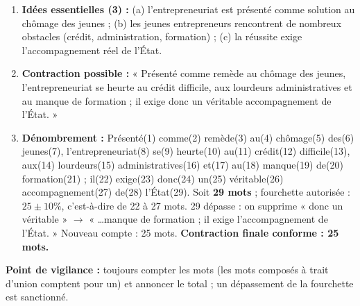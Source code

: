 \documentclass[11pt]{article}
\begin{document}
\begin{corrige}
\begin{enumerate}
\item \textbf{Idées essentielles (3) :} (a) l'entrepreneuriat est présenté comme solution au chômage des jeunes ; (b) les jeunes entrepreneurs rencontrent de nombreux obstacles (crédit, administration, formation) ; (c) la réussite exige l'accompagnement réel de l'État.
\item \textbf{Contraction possible :} « Présenté comme remède au chômage des jeunes, l'entrepreneuriat se heurte au crédit difficile, aux lourdeurs administratives et au manque de formation ; il exige donc un véritable accompagnement de l'État. »
\item \textbf{Dénombrement :} Présenté(1) comme(2) remède(3) au(4) chômage(5) des(6) jeunes(7), l'entrepreneuriat(8) se(9) heurte(10) au(11) crédit(12) difficile(13), aux(14) lourdeurs(15) administratives(16) et(17) au(18) manque(19) de(20) formation(21) ; il(22) exige(23) donc(24) un(25) véritable(26) accompagnement(27) de(28) l'État(29). Soit \textbf{29 mots} ; fourchette autorisée : $25 \pm 10\%$, c'est-à-dire de 22 à 27 mots. 29 dépasse : on supprime « donc un véritable » $\rightarrow$ « \ldots manque de formation ; il exige l'accompagnement de l'État. » Nouveau compte : 25 mots. \textbf{Contraction finale conforme : 25 mots.}
\end{enumerate}
\textbf{Point de vigilance :} toujours compter les mots (les mots composés à trait d'union comptent pour un) et annoncer le total ; un dépassement de la fourchette est sanctionné.
\end{corrige}
\end{document}
